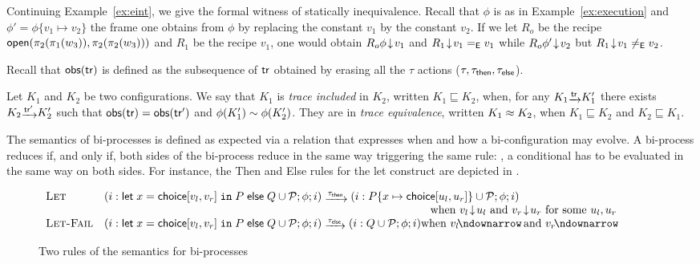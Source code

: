  \begin{example}
 \label{ex:app:static-ap}
Continuing Example~\ref{ex:eint}, we give the formal witness of statically inequivalence.
Recall that $\phi$ is as in Example~\ref{ex:execution} and
$\phi'=\phi \{v_1\mapsto v_2\}$
\ie the frame one obtains from $\phi$ by replacing the constant
$v_1$ by the constant $v_2$.
If we let $R_o$ be the recipe
$\mathsf{open}(\pi_2(\pi_1(w_3)), \pi_2(\pi_2(w_3)))$
and $R_1$ be the recipe $v_1$,
one would obtain $R_o\phi\!\downarrow\! v_1$ and $R_1\!\downarrow\! v_1=_{\mathsf{E}} v_1$
while $R_o\phi'\!\downarrow\! v_2$ but $R_1\!\downarrow\! v_1\not=_{\mathsf{E}} v_2$.
 \end{example}


Recall that
$\mathsf{obs}(\mathsf{tr})$ is defined as the subsequence of $\mathsf{tr}$
obtained by erasing all the $\tau$ actions (\ie $\tau,\tau_{\mathsf{then}},\tau_{\mathsf{else}}$).

\begin{definition}%
  Let $K_1$ and $K_2$ be two configurations.
  We say that $K_1$ is \emph{trace included} in $K_2$,
  written $K_1 \sqsubseteq K_2$, when,
  for any $K_1\sint{\tr}K_1'$
  there exists $K_2\sint{\tr'}K_2'$ such that
  $\mathsf{obs}(\mathsf{tr}) = \mathsf{obs}(\mathsf{tr}')$
  and $\phi(K_1') \sim \phi(K_2')$.
  They are in \emph{trace equivalence}, written $K_1 \approx K_2$, 
  when $K_1 \sqsubseteq K_2$ and $K_2 \sqsubseteq K_1$.
\end{definition}



\label{ap:model:diff}

The semantics of bi-processes is defined as expected via a relation
that expresses when  and how a bi-configuration may evolve.
A bi-process reduces if, and only if,
both sides of the bi-process 
reduce in the same way triggering the same rule: \eg,
a conditional has to be evaluated in the same way on both sides.
For instance, the {\sc Then} and {\sc Else} rules for the {\sc let}
construct are depicted in .

\begin{figure*}[t]
  \centering
  $  \begin{array}{ll}
    \textsc{Let}&(\phase i \Let \; x = \choice{v_l}{v_r} \; \In \; P \; \Else \; Q\cup \p; \phi; i) \; \lrstep{\taut} \;
                  (\phase i P\{x \mapsto \choice{u_l}{u_r}\} \cup
                  \p; \phi; i)\\
    \multicolumn{2}{r}{\mbox{
    when $v_l\redc u_l$ and $v_r\redc u_r$ for some $u_l,u_r$}}\\%
    \textsc{Let-Fail}&(\phase i \Let \; x = \choice{v_l}{v_r} \; \In \; P \; \Else \; Q\cup \p; \phi; i) \; \lrstep{\taue} \;
                       (\phase i Q \cup \p; \phi; i) 
                       \hfill \mbox{when $v_l\redcb$ and $v_r\redcb$}
  \end{array}$
  \caption{Two rules of the semantics for bi-processes}
  \label{fig:biproc:sem}
\end{figure*}

